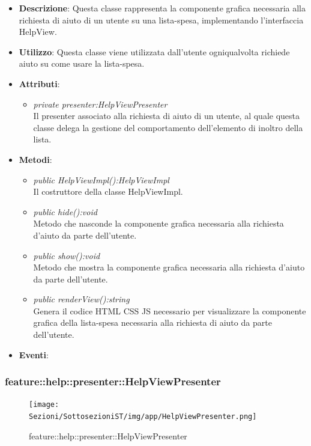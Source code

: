 \begin{itemize}
\item \textbf{Descrizione}: Questa classe rappresenta la componente grafica necessaria alla richiesta di aiuto di un utente su una lista-spesa, implementando l'interfaccia HelpView.
\item \textbf{Utilizzo}: Questa classe viene utilizzata dall'utente ogniqualvolta richiede aiuto su come usare la lista-spesa.
\item \textbf{Attributi}:
\begin{itemize}
\item \textit{private presenter:HelpViewPresenter}\\
Il presenter associato alla richiesta di aiuto di un utente, al quale questa classe delega la gestione del comportamento dell'elemento di inoltro della lista.
\end{itemize}
\item \textbf{Metodi}:
	\begin{itemize}
	\item \textit{public HelpViewImpl():HelpViewImpl}\\
	Il costruttore della classe HelpViewImpl.
	\item \textit{public hide():void}\\
	Metodo che nasconde la componente grafica necessaria alla richiesta d'aiuto da parte dell'utente.
	\item \textit{public show():void}\\
	Metodo che mostra la componente grafica necessaria alla richiesta d'aiuto da parte dell'utente.
	\item \textit{public renderView():string}\\
	Genera il codice HTML CSS JS necessario per visualizzare la componente grafica della lista-spesa necessaria alla richiesta di aiuto da parte dell'utente.
	\end{itemize}
\item \textbf{Eventi}:
\end{itemize}

\subsubsection{feature::help::presenter::HelpViewPresenter}

\label{feature::help::presenter::HelpViewPresenter}
\begin{figure}[H]
	\centering
	\texttt{[image: Sezioni/SottosezioniST/img/app/HelpViewPresenter.png]}
	\caption{feature::help::presenter::HelpViewPresenter}
\end{figure}

